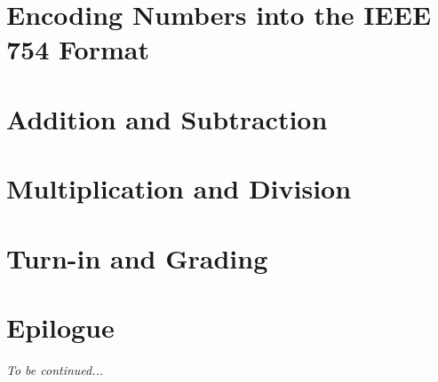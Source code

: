     \section{Encoding Numbers into the IEEE 754 Format}                 

    \section{Addition and Subtraction}                                  

    \section{Multiplication and Division}                               

    \section{Turn-in and Grading}                                       

    \section*{Epilogue}                                                 \GoingBackToTheZoo

    \textit{To be continued...}


